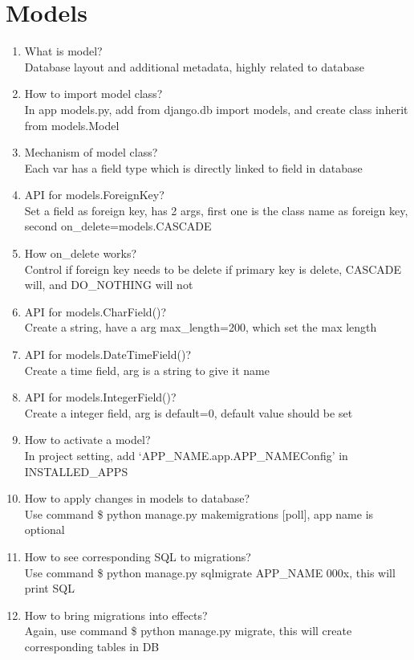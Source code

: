 \documentclass[10pt,a4paper,oneside]{article}
\begin{document}
\section{Models}
\begin{enumerate}[1.]
\item What is model?\\
Database layout and additional metadata, highly related to database
\item How to import model class?\\
In app models.py, add from django.db import models, and create class inherit from models.Model
\item Mechanism of model class?\\
Each var has a field type which is directly linked to field in database
\item API for models.ForeignKey?\\
Set a field as foreign key, has 2 args, first one is the class name as foreign key, second on\_delete=models.CASCADE
\item How on\_delete works?\\
Control if foreign key needs to be delete if primary key is delete, CASCADE will, and DO\_NOTHING will not
\item API for models.CharField()?\\
Create a string, have a arg max\_length=200, which set the max length
\item API for models.DateTimeField()?\\
Create a time field, arg is a string to give it name
\item API for models.IntegerField()?\\
Create a integer field, arg is default=0, default value should be set
\item How to activate a model?\\
In project setting, add `APP\_NAME.app.APP\_NAMEConfig' in INSTALLED\_APPS
\item How to apply changes in models to database?\\
Use command \$ python manage.py makemigrations [poll], app name is optional
\item How to see corresponding SQL to migrations?\\
Use command \$ python manage.py sqlmigrate APP\_NAME 000x, this will print SQL
\item How to bring migrations into effects?\\
Again, use command \$ python manage.py migrate, this will create corresponding tables in DB

\end{enumerate}
\end{document}
